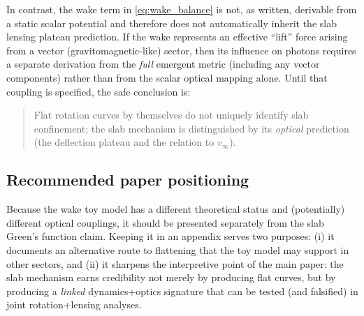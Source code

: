 \documentclass[11pt]{article}
\begin{document}
In contrast, the wake term in \eqref{eq:wake_balance} is not, as written, derivable from a static
scalar potential and therefore does not automatically inherit the slab lensing plateau prediction.
If the wake represents an effective ``lift'' force arising from a vector (gravitomagnetic-like)
sector, then its influence on photons requires a separate derivation from the \emph{full} emergent
metric (including any vector components) rather than from the scalar optical mapping alone.
Until that coupling is specified, the safe conclusion is:

\begin{quote}
Flat rotation curves by themselves do not uniquely identify slab confinement; the slab mechanism is
distinguished by its \emph{optical} prediction (the deflection plateau and the relation to
$v_\infty$).
\end{quote}

\subsection{Recommended paper positioning}

Because the wake toy model has a different theoretical status and (potentially) different optical
couplings, it should be presented separately from the slab Green's function claim.  Keeping it in an
appendix serves two purposes:
(i) it documents an alternative route to flattening that the toy model may support in other sectors,
and
(ii) it sharpens the interpretive point of the main paper: the slab mechanism earns credibility not
merely by producing flat curves, but by producing a \emph{linked} dynamics+optics signature that can
be tested (and falsified) in joint rotation+lensing analyses.
\end{document}
